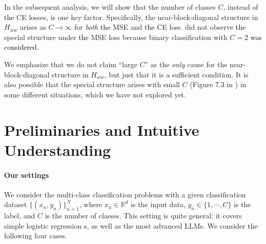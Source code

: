 \documentclass{article}
\newcommand{\1}{^{(1)}}
\newcommand{\2}{^{(2)}}
\newcommand{\zhaoruirevise}[1]{\textcolor{black}{ #1}}
\begin{document}
In the subsequent analysis, we will show that the number of classes $C$, instead of \zhaoruirevise{the}  CE losses, is one key factor. Specifically, the near-block-diagonal structure in $H_{ww}$ arises as $C \rightarrow \infty$ for {\it both} \zhaoruirevise{the} MSE and \zhaoruirevise{the} CE loss.  \citep{collobert2004large} did not observe \zhaoruirevise{the} special structure under \zhaoruirevise{the} MSE loss because binary classification with $C = 2$ \zhaoruirevise{was considered}. 

We emphasize that we do not claim ``large $C$'' as the {\it only} cause for the near-block-diagonal structure in $H_{ww}$, but just that it is a sufficient condition. It is also possible that the special structure arises with small $C$ (Figure 7.3 in \citep{collobert2004large}) in some different situations, which we have not explored yet.



\section{Preliminaries and Intuitive Understanding}
\label{sec_preliminaries}



\paragraph{Our settings} We consider the multi-class classification problems with a given classification dataset $\{(x_n,y_n)\}_{n = 1}^N$, where $x_n \in \mathbb{R}^{d}$ is the input data, $y_n\in \{1,\cdots, C\}$ is the label,  and $C$ is the number of classes. This setting is quite general: it covers simple logistic regression\zhaoruirevise{s}, as well as the most advanced  LLMs.  We consider the following four cases.
\end{document}

